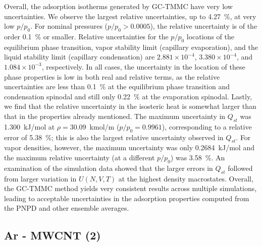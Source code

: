 Overall, the adsorption isotherms generated by GC-TMMC have very low uncertainties. We observe the largest relative uncertainties, up to 4.27~\%, at very low $p/p_0$. For nominal pressures ($p/p_0 > 0.0005$), the relative uncertainty is of the order 0.1~\% or smaller. Relative uncertainties for the $p/p_0$ locations of the equilibrium phase transition, vapor stability limit (capillary evaporation), and the liquid stability limit (capillary condensation) are $2.881 \times 10^{-4}$, $3.380 \times 10^{-4}$, and $1.084 \times 10^{-3}$, respectively. In all cases, the uncertainty in the location of these phase properties is low in both real and relative terms, as the relative uncertainties are less than 0.1~\% at the equilibrium phase transition and condensation spinodal and still only 0.22~\% at the evaporation spinodal. Lastly, we find that the relative uncertainty in the isosteric heat is somewhat larger than that in the properties already mentioned. The maximum uncertainty in $Q_{st}$ was 1.300~kJ/mol at $\rho = 30.09$~kmol/m ($p/p_0 = 0.9961$), corresponding to a relative error of 5.38~\%; this is also the largest relative uncertainty observed in $Q_{st}$. For vapor densities, however, the maximum uncertainty was only 0.2684~kJ/mol and the maximum relative uncertainty (at a different $p/p_0$) was 3.58~\%. An examination of the simulation data showed that the larger errors in $Q_{st}$ followed from larger variation in $U\left(N,V,T\right)$ at the highest density macrostates. Overall, the GC-TMMC method yields very consistent results across multiple simulations, leading to acceptable uncertainties in the adsorption properties computed from the PNPD and other ensemble averages.


\subsection{Ar - MWCNT (2)}

